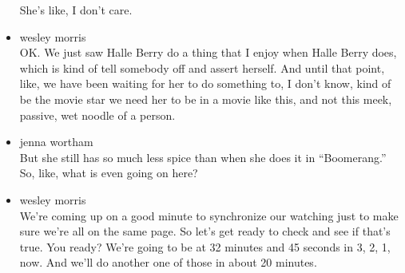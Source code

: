 \begin{itemize}
  She's like, I don't care.
\item
  wesley morris\\
  OK. We just saw Halle Berry do a thing that I enjoy when Halle Berry
  does, which is kind of tell somebody off and assert herself. And until
  that point, like, we have been waiting for her to do something to, I
  don't know, kind of be the movie star we need her to be in a movie
  like this, and not this meek, passive, wet noodle of a person.
\item
  jenna wortham\\
  But she still has so much less spice than when she does it in
  ``Boomerang.'' So, like, what is even going on here?
\item
  wesley morris\\
  We're coming up on a good minute to synchronize our watching just to
  make sure we're all on the same page. So let's get ready to check and
  see if that's true. You ready? We're going to be at 32 minutes and 45
  seconds in 3, 2, 1, now. And we'll do another one of those in about 20
  minutes.


\end{itemize}
